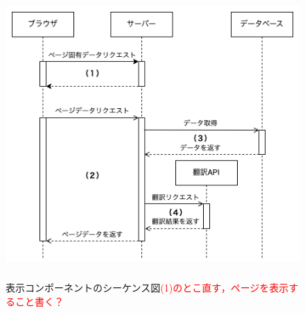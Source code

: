 \documentclass[b5paper,12pt,dvipdfmx]{jsreport}
\newcommand{\red}[1]{\textcolor{red}{#1}}
\begin{document}
\begin{figure}[H]
    \centering
    \includegraphics[width=120mm,height=110mm]{./img/components/display_component_sequence_diagram.png}
    \caption{表示コンポーネントのシーケンス図\red{(1)のとこ直す，ページを表示すること書く？}}
    \label{display_component_sequence_diagram}
\end{figure}







\end{document}
